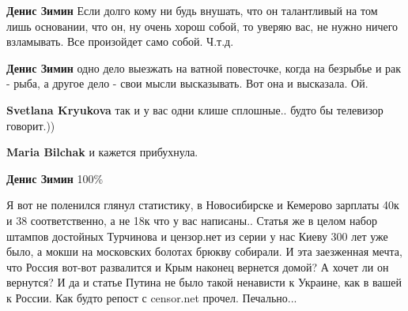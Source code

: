 \begin{itemize}
 
\textbf{Денис Зимин} Если долго кому ни будь внушать, что он талантливый на том лишь основании, что он, ну очень хорош собой, то уверяю вас, не нужно ничего взламывать. Все произойдет само собой. Ч.т.д.

 
\textbf{Денис Зимин} одно дело выезжать на ватной повесточке, когда на безрыбье и рак - рыба, а другое дело - свои мысли высказывать. Вот она и высказала. Ой.

 
\textbf{Svetlana Kryukova} так и у вас одни клише сплошные.. будто бы телевизор говорит.))

 
\textbf{Maria Bilchak} и кажется прибухнула.

 
\textbf{Денис Зимин} 100\%

 

Я вот не поленился глянул статистику, в Новосибирске и Кемерово зарплаты 40к и
38 соответственно, а не 18к что у вас написаны.. Статья же в целом набор
штампов достойных Турчинова и цензор.нет из серии у нас Киеву 300 лет уже было,
а мокши на московских болотах брюкву собирали. И эта заезженная мечта, что
Россия вот-вот развалится и Крым наконец вернется домой? А хочет ли он
вернутся? И да и статье Путина не было такой ненависти к Украине, как в вашей к
России. Как будто репост с censor.net прочел. Печально...


\end{itemize}
